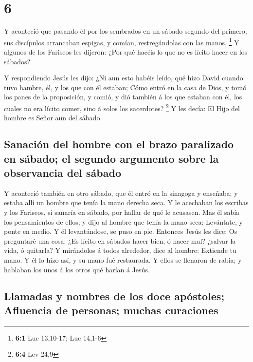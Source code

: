 \hypertarget{section-5}{%
\section{6}\label{section-5}}

 Y aconteció que pasando él por los sembrados en un sábado
segundo del primero, sus discípulos arrancaban espigas, y comían,
restregándolas con las manos. \footnote{\textbf{6:1} Luc 13,10-17; Luc
  14,1-6}  Y algunos de los Fariseos les dijeron: ¿Por qué
hacéis lo que no es lícito hacer en los sábados?

 Y respondiendo Jesús les dijo: ¿Ni aun esto habéis leído,
qué hizo David cuando tuvo hambre, él, y los que con él estaban;
 Cómo entró en la casa de Dios, y tomó los panes de la
proposición, y comió, y dió también á los que estaban con él, los cuales
no era lícito comer, sino á solos los sacerdotes? \footnote{\textbf{6:4}
  Lev 24,9}  Y les decía: El Hijo del hombre es Señor aun
del sábado.

\hypertarget{sanaciuxf3n-del-hombre-con-el-brazo-paralizado-en-suxe1bado-el-segundo-argumento-sobre-la-observancia-del-suxe1bado}{%
\subsection{Sanación del hombre con el brazo paralizado en sábado; el
segundo argumento sobre la observancia del
sábado}\label{sanaciuxf3n-del-hombre-con-el-brazo-paralizado-en-suxe1bado-el-segundo-argumento-sobre-la-observancia-del-suxe1bado}}

 Y aconteció también en otro sábado, que él entró en la
sinagoga y enseñaba; y estaba allí un hombre que tenía la mano derecha
seca.  Y le acechaban los escribas y los Fariseos, si
sanaría en sábado, por hallar de qué le acusasen.  Mas él
sabía los pensamientos de ellos; y dijo al hombre que tenía la mano
seca: Levántate, y ponte en medio. Y él levantándose, se puso en pie.
 Entonces Jesús les dice: Os preguntaré una cosa: ¿Es lícito
en sábados hacer bien, ó hacer mal? ¿salvar la vida, ó quitarla?
 Y mirándolos á todos alrededor, dice al hombre: Extiende
tu mano. Y él lo hizo así, y su mano fué restaurada.  Y
ellos se llenaron de rabia; y hablaban los unos á los otros qué harían á
Jesús.

\hypertarget{llamadas-y-nombres-de-los-doce-apuxf3stoles-afluencia-de-personas-muchas-curaciones}{%
\subsection{Llamadas y nombres de los doce apóstoles; Afluencia de
personas; muchas
curaciones}\label{llamadas-y-nombres-de-los-doce-apuxf3stoles-afluencia-de-personas-muchas-curaciones}}

